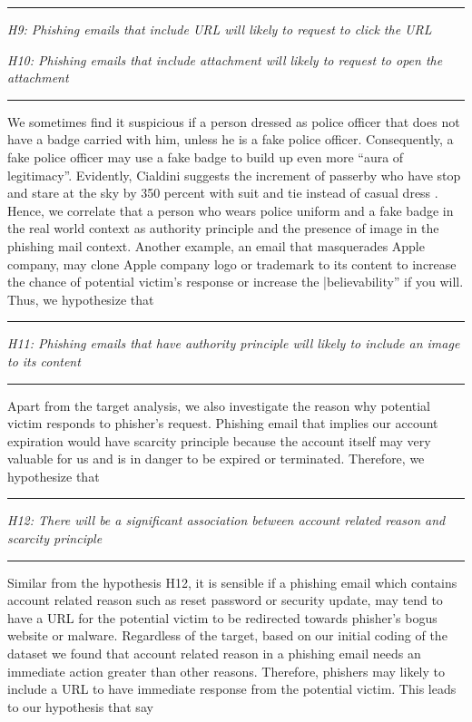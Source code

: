 \rule[0.5ex]{1\columnwidth}{1pt}

\textit{H9: Phishing emails that include URL will likely to request
to click the URL}

\textit{H10: Phishing emails that include attachment will likely to
request to open the attachment}

\rule[0.5ex]{1\columnwidth}{1pt}

We sometimes find it suspicious if a person dressed as police officer
that does not have a badge carried with him, unless he is a fake police
officer. Consequently, a fake police officer may use a fake badge
to build up even more ``aura of legitimacy''. Evidently, Cialdini
suggests the increment of passerby who have stop and stare at the
sky by 350 percent with suit and tie instead of casual dress \cite{cialdini:2001}.
Hence, we correlate that a person who wears police uniform and a fake
badge in the real world context as authority principle and the presence
of image in the phishing mail context. Another example, an email that
masquerades Apple company, may clone Apple company logo or trademark
to its content to increase the chance of potential victim's response
or increase the |believability'' if you will. Thus, we hypothesize
that

\rule[0.5ex]{1\columnwidth}{1pt}

\textit{H11: Phishing emails that have authority principle will likely
to include an image to its content}

\rule[0.5ex]{1\columnwidth}{1pt}

Apart from the target analysis, we also investigate the reason why
potential victim responds to phisher's request. Phishing email that
implies our account expiration would have scarcity principle because
the account itself may very valuable for us and is in danger to be
expired or terminated. Therefore, we hypothesize that

\rule[0.5ex]{1\columnwidth}{1pt}

\textit{H12: There will be a significant association between account
related reason and scarcity principle }

\rule[0.5ex]{1\columnwidth}{1pt}

Similar from the hypothesis H12, it is sensible if a phishing email
which contains account related reason such as reset password or security
update, may tend to have a URL for the potential victim to be redirected
towards phisher's bogus website or malware. Regardless of the target,
based on our initial coding of the dataset we found that account related
reason in a phishing email needs an immediate action greater than
other reasons. Therefore, phishers may likely to include a URL to
have immediate response from the potential victim. This leads to our
hypothesis that say

